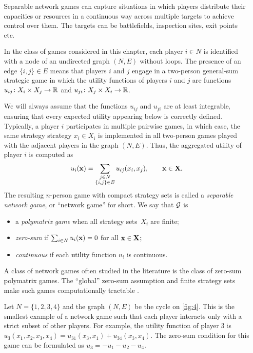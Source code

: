 Separable network games can capture situations in which players distribute their capacities or resources in a continuous way across multiple targets to achieve control over them. The targets can be battlefields, inspection sites, exit points etc.

In the class of games considered in this chapter, each player $i \in N$ is identified with a node of an undirected graph $(N,E)$ without loops. The presence of an edge $\{i,j\}\in E$ means that players $i$ and $j$ engage in a two-person general-sum strategic game in which the utility functions of players $i$ and $j$ are functions $u_{ij}\colon X_i\times X_j\to\mathbb{R}$ and $u_{ji}\colon X_j\times X_i\to\mathbb{R}$.

We will always assume that the functions $u_{ij}$ and $u_{ji}$ are at least integrable, ensuring that every expected utility appearing below is correctly defined. Typically, a player $i$ participates in multiple pairwise games, in which case, the same strategy strategy $x_i\in X_i$ is implemented in all two-person games played with the adjacent players in the graph $(N,E)$. Thus, the aggregated utility of player $i$ is computed as
\begin{equation}\label{def:pi}
    u_i(\mathbf{x}) = \sum_{\substack{j\in N \\ \{i,j\}\in E}} u_{ij}(x_i,x_j), \qquad \mathbf{x}\in\mathbf{X}.
\end{equation}
The resulting $n$-person game with compact strategy sets is called a \emph{separable network game}, or ``network game'' for short. We say that $\mathcal{G}$ is
\begin{itemize}
    \item a \emph{polymatrix game} when all strategy sets~$X_i$ are finite;
    \item \emph{zero-sum} if  $\sum_{i\in N} u_i(\mathbf{x})=0$ for all $\mathbf{x}\in\mathbf{X}$;
    \item \emph{continuous} if each utility function $u_i$ is continuous.
\end{itemize}
A class of network games often studied in the literature is the class of zero-sum polymatrix games. The ``global'' zero-sum assumption and finite strategy sets make such games computationally tractable \cite{Cai16,FPNet,Bailey19,Rubinstein,CaiDaskalkis}.

\begin{example}
Let $N=\{1,2,3,4\}$ and the graph $(N,E)$ be the cycle on \cref{fig:4}. This is the smallest example of a network game such that each player interacts only with a strict subset of other players. For example, the utility function of player $3$ is $u_3(x_1,x_2,x_3,x_4)=u_{31}(x_3,x_1)+u_{34}(x_3,x_4)$. The zero-sum condition for this game can be formulated as $u_3=-u_1-u_2-u_4$.
\end{example}

